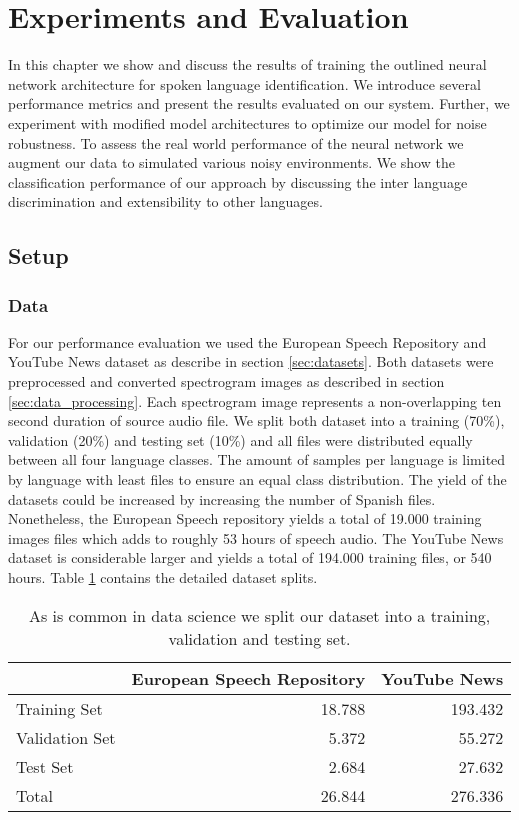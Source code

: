 \section{Experiments and Evaluation} 
\label{sec:evaluation}
In this chapter we show and discuss the results of training the outlined neural network architecture for spoken language identification. We introduce several performance metrics and present the results evaluated on our system.
Further, we experiment with modified model architectures to optimize our model for noise robustness. To assess the real world performance of the neural network we augment our data to simulated various noisy environments. We show the classification performance of our approach by discussing the inter language discrimination and extensibility to other languages.     

\subsection{Setup} 
\label{sec:setup}


\subsubsection{Data} 
\label{sec:data}
For our performance evaluation we used the European Speech Repository and YouTube News dataset as describe in section \ref{sec:datasets}. Both datasets were preprocessed and converted spectrogram images as described in section \ref{sec:data_processing}. Each spectrogram image represents a non-overlapping ten second duration of source audio file. 
We split both dataset into a training (70\%), validation (20\%) and testing set (10\%) and all files were distributed equally between all four language classes. The amount of samples per language is limited by language with least files to ensure an equal class distribution. The yield of the datasets could be increased by increasing the number of Spanish files. Nonetheless, the European Speech repository yields a total of 19.000 training images files which adds to roughly 53 hours of speech audio. The YouTube News dataset is considerable larger and yields a total of 194.000 training files, or 540 hours. Table \ref{tab:data_splits} contains the detailed dataset splits.

	\begin{table}[]
	\centering
	\begin{tabularx}{\textwidth}{lrr}
	\toprule
	  				& European Speech Repository & YouTube News\\ \midrule
	Training Set    & 18.788						 & 193.432 \\
	Validation Set  & 5.372						 & 55.272 \\
	Test Set        & 2.684						 & 27.632 \\
	\midrule
	Total           & 26.844						 & 276.336 \\
	\bottomrule
	\end{tabularx}
	\caption{As is common in data science we split our dataset into a training, validation and testing set.}
	\label{tab:data_splits}
	\end{table}

